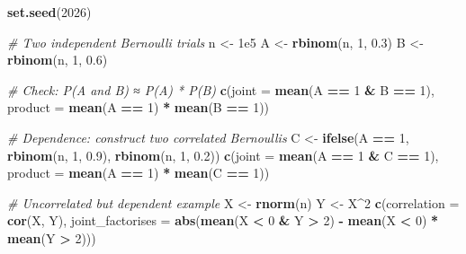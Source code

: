 \documentclass[
]{article}
\newenvironment{Shaded}{\begin{snugshade}}{\end{snugshade}}
\newcommand{\AttributeTok}[1]{\textcolor[rgb]{0.13,0.29,0.53}{#1}}
\newcommand{\CommentTok}[1]{\textcolor[rgb]{0.56,0.35,0.01}{\textit{#1}}}
\newcommand{\DecValTok}[1]{\textcolor[rgb]{0.00,0.00,0.81}{#1}}
\newcommand{\FloatTok}[1]{\textcolor[rgb]{0.00,0.00,0.81}{#1}}
\newcommand{\FunctionTok}[1]{\textcolor[rgb]{0.13,0.29,0.53}{\textbf{#1}}}
\newcommand{\NormalTok}[1]{#1}
\newcommand{\OtherTok}[1]{\textcolor[rgb]{0.56,0.35,0.01}{#1}}
\newcommand{\SpecialCharTok}[1]{\textcolor[rgb]{0.81,0.36,0.00}{\textbf{#1}}}
\begin{document}
\begin{Shaded}
\begin{Highlighting}[]
\FunctionTok{set.seed}\NormalTok{(}\DecValTok{2026}\NormalTok{)}

\CommentTok{\# Two independent Bernoulli trials}
\NormalTok{n }\OtherTok{\textless{}{-}} \FloatTok{1e5}
\NormalTok{A }\OtherTok{\textless{}{-}} \FunctionTok{rbinom}\NormalTok{(n, }\DecValTok{1}\NormalTok{, }\FloatTok{0.3}\NormalTok{)}
\NormalTok{B }\OtherTok{\textless{}{-}} \FunctionTok{rbinom}\NormalTok{(n, }\DecValTok{1}\NormalTok{, }\FloatTok{0.6}\NormalTok{)}

\CommentTok{\# Check: P(A and B) ≈ P(A) * P(B)}
\FunctionTok{c}\NormalTok{(}\AttributeTok{joint =} \FunctionTok{mean}\NormalTok{(A }\SpecialCharTok{==} \DecValTok{1} \SpecialCharTok{\&}\NormalTok{ B }\SpecialCharTok{==} \DecValTok{1}\NormalTok{),}
  \AttributeTok{product =} \FunctionTok{mean}\NormalTok{(A }\SpecialCharTok{==} \DecValTok{1}\NormalTok{) }\SpecialCharTok{*} \FunctionTok{mean}\NormalTok{(B }\SpecialCharTok{==} \DecValTok{1}\NormalTok{))}

\CommentTok{\# Dependence: construct two correlated Bernoullis}
\NormalTok{C }\OtherTok{\textless{}{-}} \FunctionTok{ifelse}\NormalTok{(A }\SpecialCharTok{==} \DecValTok{1}\NormalTok{, }\FunctionTok{rbinom}\NormalTok{(n, }\DecValTok{1}\NormalTok{, }\FloatTok{0.9}\NormalTok{), }\FunctionTok{rbinom}\NormalTok{(n, }\DecValTok{1}\NormalTok{, }\FloatTok{0.2}\NormalTok{))}
\FunctionTok{c}\NormalTok{(}\AttributeTok{joint =} \FunctionTok{mean}\NormalTok{(A }\SpecialCharTok{==} \DecValTok{1} \SpecialCharTok{\&}\NormalTok{ C }\SpecialCharTok{==} \DecValTok{1}\NormalTok{),}
  \AttributeTok{product =} \FunctionTok{mean}\NormalTok{(A }\SpecialCharTok{==} \DecValTok{1}\NormalTok{) }\SpecialCharTok{*} \FunctionTok{mean}\NormalTok{(C }\SpecialCharTok{==} \DecValTok{1}\NormalTok{))}

\CommentTok{\# Uncorrelated but dependent example}
\NormalTok{X }\OtherTok{\textless{}{-}} \FunctionTok{rnorm}\NormalTok{(n)}
\NormalTok{Y }\OtherTok{\textless{}{-}}\NormalTok{ X}\SpecialCharTok{\^{}}\DecValTok{2}
\FunctionTok{c}\NormalTok{(}\AttributeTok{correlation =} \FunctionTok{cor}\NormalTok{(X, Y),}
  \AttributeTok{joint\_factorises =} \FunctionTok{abs}\NormalTok{(}\FunctionTok{mean}\NormalTok{(X }\SpecialCharTok{\textless{}} \DecValTok{0} \SpecialCharTok{\&}\NormalTok{ Y }\SpecialCharTok{\textgreater{}} \DecValTok{2}\NormalTok{) }\SpecialCharTok{{-}}
                          \FunctionTok{mean}\NormalTok{(X }\SpecialCharTok{\textless{}} \DecValTok{0}\NormalTok{) }\SpecialCharTok{*} \FunctionTok{mean}\NormalTok{(Y }\SpecialCharTok{\textgreater{}} \DecValTok{2}\NormalTok{)))}
\end{Highlighting}
\end{Shaded}
\end{document}
